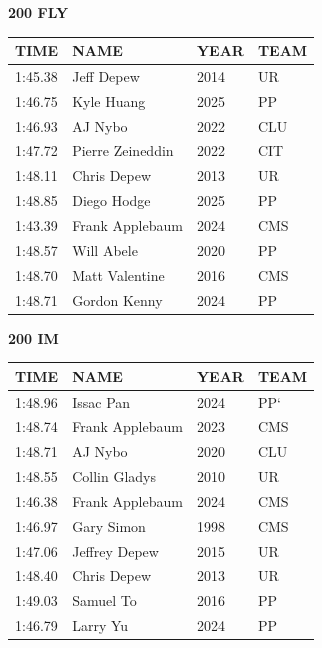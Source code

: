 \begin{table}[H]
\centering
\begin{minipage}[t]{0.48\textwidth}
\centering
\textbf{200 FLY}\\[0.1cm]
\begin{tabular}{@{}p{1.8cm}p{2.8cm}p{1.2cm}p{1.4cm}@{}}
\hline
    \textbf{TIME} & \textbf{NAME} & \textbf{YEAR} & \textbf{TEAM} \\
\hline
    1:45.38 & Jeff Depew & 2014 & UR \\
    1:46.75 & Kyle Huang & 2025 & PP \\
    1:46.93 & AJ Nybo & 2022 & CLU \\
    1:47.72 & Pierre Zeineddin & 2022 & CIT \\
    1:48.11 & Chris Depew & 2013 & UR \\
    1:48.85 & Diego Hodge & 2025 & PP \\
    1:43.39 & Frank Applebaum & 2024 & CMS \\
    1:48.57 & Will Abele & 2020 & PP \\
    1:48.70 & Matt Valentine & 2016 & CMS \\
    1:48.71 & Gordon Kenny & 2024 & PP \\
\hline
\end{tabular}
\end{minipage}\hfill
\begin{minipage}[t]{0.48\textwidth}
\centering
\textbf{200 IM}\\[0.1cm]
\begin{tabular}{@{}p{1.8cm}p{2.8cm}p{1.2cm}p{1.4cm}@{}}
\hline
    \textbf{TIME} & \textbf{NAME} & \textbf{YEAR} & \textbf{TEAM} \\
\hline
    1:48.96 & Issac Pan & 2024 & PP` \\
    1:48.74 & Frank Applebaum & 2023 & CMS \\
    1:48.71 & AJ Nybo & 2020 & CLU \\
    1:48.55 & Collin Gladys & 2010 & UR \\
    1:46.38 & Frank Applebaum & 2024 & CMS \\
    1:46.97 & Gary Simon & 1998 & CMS \\
    1:47.06 & Jeffrey Depew & 2015 & UR \\
    1:48.40 & Chris Depew & 2013 & UR \\
    1:49.03 & Samuel To & 2016 & PP \\
    1:46.79 & Larry Yu & 2024 & PP \\
\hline
\end{tabular}
\end{minipage}
\end{table}

